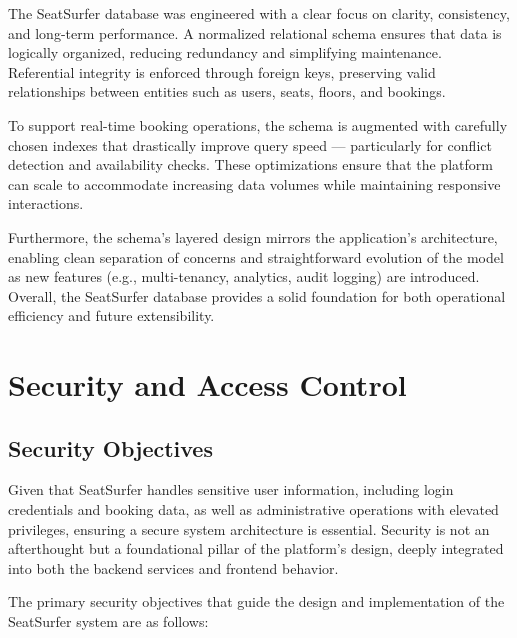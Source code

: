 \documentclass[12pt,a4paper]{report} %
\begin{document}
The SeatSurfer database was engineered with a clear focus on clarity, consistency, and long-term performance. A normalized relational schema ensures that data is logically organized, reducing redundancy and simplifying maintenance. Referential integrity is enforced through foreign keys, preserving valid relationships between entities such as users, seats, floors, and bookings.

To support real-time booking operations, the schema is augmented with carefully chosen indexes that drastically improve query speed — particularly for conflict detection and availability checks. These optimizations ensure that the platform can scale to accommodate increasing data volumes while maintaining responsive interactions.

Furthermore, the schema's layered design mirrors the application's architecture, enabling clean separation of concerns and straightforward evolution of the model as new features (e.g., multi-tenancy, analytics, audit logging) are introduced. Overall, the SeatSurfer database provides a solid foundation for both operational efficiency and future extensibility.

\newpage

\chapter{Security and Access Control}

\section{Security Objectives}

Given that SeatSurfer handles sensitive user information, including login credentials and booking data, as well as administrative operations with elevated privileges, ensuring a secure system architecture is essential. Security is not an afterthought but a foundational pillar of the platform's design, deeply integrated into both the backend services and frontend behavior.

The primary security objectives that guide the design and implementation of the SeatSurfer system are as follows:
\end{document}
